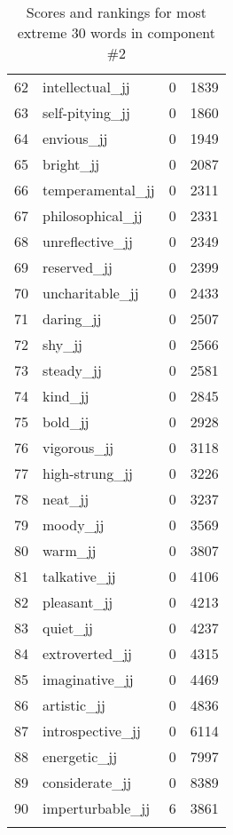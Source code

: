 \begin{longtable}[!htbp]{| rlr@{.}l |}
    62 & intellectual\_jj & 0 & 1839 \\
    63 & self-pitying\_jj & 0 & 1860 \\
    64 & envious\_jj & 0 & 1949 \\
    65 & bright\_jj & 0 & 2087 \\
    66 & temperamental\_jj & 0 & 2311 \\
    67 & philosophical\_jj & 0 & 2331 \\
    68 & unreflective\_jj & 0 & 2349 \\
    69 & reserved\_jj & 0 & 2399 \\
    70 & uncharitable\_jj & 0 & 2433 \\
    71 & daring\_jj & 0 & 2507 \\
    72 & shy\_jj & 0 & 2566 \\
    73 & steady\_jj & 0 & 2581 \\
    74 & kind\_jj & 0 & 2845 \\
    75 & bold\_jj & 0 & 2928 \\
    76 & vigorous\_jj & 0 & 3118 \\
    77 & high-strung\_jj & 0 & 3226 \\
    78 & neat\_jj & 0 & 3237 \\
    79 & moody\_jj & 0 & 3569 \\
    80 & warm\_jj & 0 & 3807 \\
    81 & talkative\_jj & 0 & 4106 \\
    82 & pleasant\_jj & 0 & 4213 \\
    83 & quiet\_jj & 0 & 4237 \\
    84 & extroverted\_jj & 0 & 4315 \\
    85 & imaginative\_jj & 0 & 4469 \\
    86 & artistic\_jj & 0 & 4836 \\
    87 & introspective\_jj & 0 & 6114 \\
    88 & energetic\_jj & 0 & 7997 \\
    89 & considerate\_jj & 0 & 8389 \\
    90 & imperturbable\_jj & 6 & 3861 \\
    \hline
    \caption{Scores and rankings for most extreme 30 words in component \#2} \\
\end{longtable}
